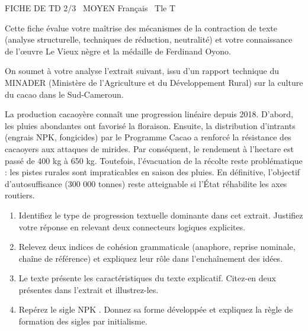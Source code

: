 \documentclass[11pt]{article}
\begin{document}
\begin{tcolorbox}[enhanced,colback=popink,colframe=popink,arc=10pt,boxrule=0pt,left=12pt,right=12pt,top=9pt,bottom=9pt]
{\color{white}\popxbold\small FICHE DE TD 2/3 \textbullet\ MOYEN \hfill Français \textbullet\ Tle T\par}
\end{tcolorbox}
\vspace{4pt}
Cette fiche évalue votre maîtrise des mécanismes de la contraction de texte (analyse structurelle, techniques de réduction, neutralité) et votre connaissance de l'œuvre \og Le Vieux nègre et la médaille \fg{} de Ferdinand Oyono.

\begin{exercice}
On soumet à votre analyse l'extrait suivant, issu d'un rapport technique du MINADER (Ministère de l'Agriculture et du Développement Rural) sur la culture du cacao dans le Sud-Cameroun.

\og La production cacaoyère connaît une progression linéaire depuis 2018. D'abord, les pluies abondantes ont favorisé la floraison. Ensuite, la distribution d'intrants (engrais NPK, fongicides) par le Programme Cacao a renforcé la résistance des cacaoyers aux attaques de mirides. Par conséquent, le rendement à l'hectare est passé de 400 kg à 650 kg. Toutefois, l'évacuation de la récolte reste problématique : les pistes rurales sont impraticables en saison des pluies. En définitive, l'objectif d'autosuffisance (300 000 tonnes) reste atteignable si l'État réhabilite les axes routiers. \fg{}

\begin{enumerate}
    \item Identifiez le type de progression textuelle dominante dans cet extrait. Justifiez votre réponse en relevant deux connecteurs logiques explicites.
    \item Relevez deux indices de cohésion grammaticale (anaphore, reprise nominale, chaîne de référence) et expliquez leur rôle dans l'enchaînement des idées.
    \item Le texte présente les caractéristiques du texte explicatif. Citez-en deux présentes dans l'extrait et illustrez-les.
    \item Repérez le sigle \og NPK \fg{}. Donnez sa forme développée et expliquez la règle de formation des sigles par initialisme.
\end{enumerate}
\end{exercice}
\end{document}

